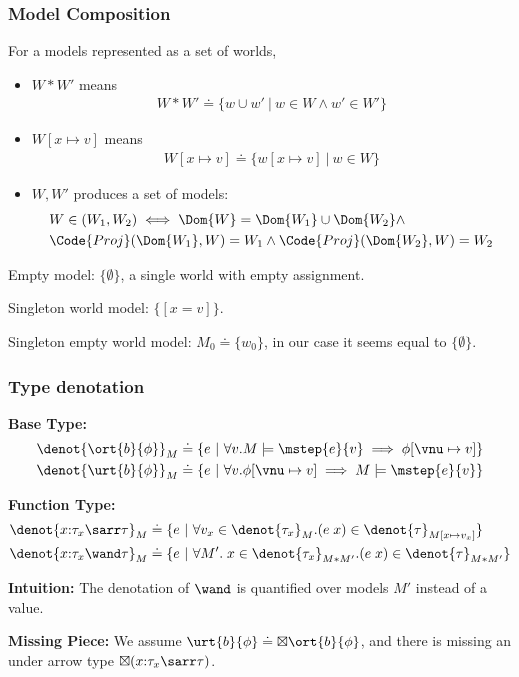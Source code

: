 \begin{frame}[fragile]
    \frametitle{Model Composition}

For a models represented as a set of worlds,
\begin{itemize}
    \item $W * W'$ means
    \begin{align*}
        W * W' \doteq \{ w \cup w' ~|~ w \in W \land w' \in W'\}
    \end{align*}
    \item $W[x\mapsto v]$ means
    \begin{align*}
        W[x\mapsto v] \doteq \{ w[x\mapsto v] ~|~ w \in W \}
    \end{align*}
    \item $W , W'$ produces a set of models:
    \begin{align*}
        &W \in (W_1 , W_2) \iff \Dom{W} = \Dom{W_1} \cup \Dom{W_2} \land
        \\&\Code{Proj}(\Dom{W_1}, W) = W_1 \land \Code{Proj}(\Dom{W_2}, W) = W_2 
    \end{align*}
\end{itemize}

Empty model: $\{\emptyset\}$, a single world with empty assignment.

Singleton world model: $\{[x = v]\}$.

Singleton empty world model: $M_0 \doteq \{ w_0 \}$, in our case it seems equal to $\{\emptyset\}$. 

\end{frame}

\begin{frame}[fragile]
    \frametitle{Type denotation}

\textbf{Base Type:}
\begin{align*}
    \denot{\ort{b}{\phi}}_M &\doteq \{ e ~|~ \forall v. M \models \mstep{e}{v} \implies \phi[\vnu \mapsto v] \} \\
    \denot{\urt{b}{\phi}}_M &\doteq \{ e ~|~ \forall v. \phi[\vnu \mapsto v] \implies M \models \mstep{e}{v} \}
\end{align*}

\textbf{Function Type:}
\begin{align*}
    \denot{x{:}\tau_x \sarr \tau}_M &\doteq \{ e ~|~ \forall v_x \in \denot{\tau_x}_M. (e\;x) \in \denot{\tau}_{M[x\mapsto v_x]} \} \\
    \denot{x{:}\tau_x \wand \tau}_M &\doteq \{ e ~|~ \forall M'.\; x\in\denot{\tau_x}_{M*M'}. (e\;x) \in \denot{\tau}_{M * M'} \}
\end{align*}

\textbf{Intuition:} The denotation of $\wand$ is quantified over models $M'$ instead of a value.

\textbf{Missing Piece:} We assume $\urt{b}{\phi} \doteq \boxtimes \ort{b}{\phi}$, and there is missing an under arrow type $\boxtimes(x{:}\tau_x \sarr \tau)$.

\end{frame}

